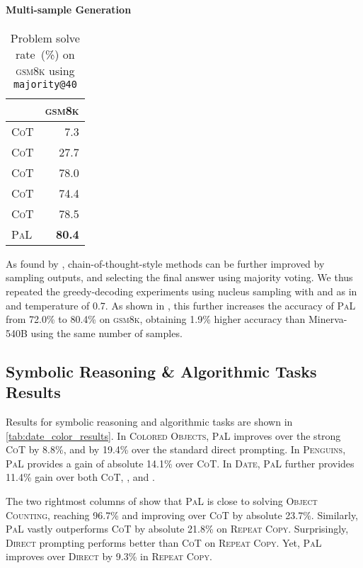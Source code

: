 \documentclass[dvipsnames]{article} \usepackage[accepted]{icml2022}
\newcommand{\ours}{\textsc{PaL}\xspace}
\newcommand{\cotp}{\textsc{CoT}\xspace}
\newcommand{\direct}{\textsc{Direct}\xspace}
\newcommand{\gsm}{\textsc{gsm8k}\xspace}
\newcommand{\repeatcopy}{\textsc{Repeat Copy}\xspace}
\newcommand{\objectcounting}{\textsc{Object Counting}\xspace}
\begin{document}
\paragraph{Multi-sample Generation}
\begin{table}[h!]
\centering
\begin{tabular}{lr}
\toprule
      & \gsm      \\
      \midrule
\cotp & 7.3  \\
\cotp & 27.7 \\
\cotp  & 78.0  \\
\cotp & 74.4  \\
\cotp & 78.5 \\
\ours  & \textbf{80.4} \\
\bottomrule
\end{tabular}
\caption{Problem solve rate~(\%) on \gsm using \texttt{majority@40} \citep{wang2022self}
} 
\label{tab:math:majority}
\end{table} As found by \citet{wang2022self}, chain-of-thought-style methods can be further improved by 
sampling  outputs, and selecting the final answer using majority voting. We thus repeated the greedy-decoding experiments using nucleus sampling \citep{holtzman2019curious} with  and  as in \citet{minerva} and temperature of 0.7. As shown in  , this further increases the accuracy of \ours from 72.0\% to 80.4\% on \gsm, obtaining 1.9\% higher accuracy than Minerva-540B using the same number of samples.




\subsection{Symbolic Reasoning \& Algorithmic Tasks Results}
Results for symbolic reasoning and algorithmic tasks are shown in \autoref{tab:date_color_results}.
In \textsc{Colored Objects}, \ours improves over the strong \cotp by 8.8\%, and by 19.4\% over the standard direct prompting.
In \textsc{Penguins}, \ours provides a gain of absolute 14.1\% over \cotp.
In \textsc{Date}, \ours further provides 11.4\% gain over both \cotp,  , and . 

The  two rightmost columns of  show that \ours is close to solving \objectcounting, reaching 96.7\% and improving over \cotp by absolute 23.7\%.
Similarly, \ours vastly outperforms \cotp by absolute 21.8\% on \repeatcopy.
Surprisingly, \direct prompting performs better than \cotp on \repeatcopy. Yet, \ours improves over \direct by 9.3\% in \repeatcopy. 
\end{document}
